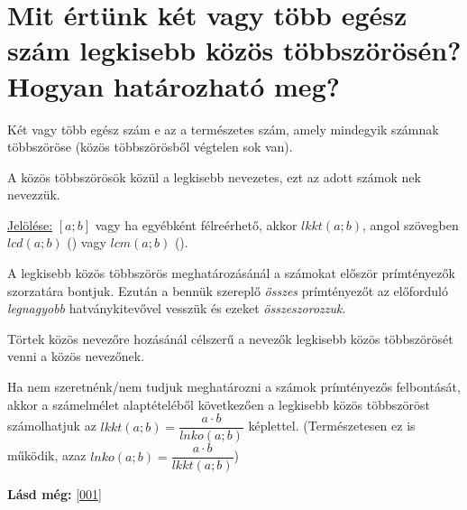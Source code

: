
\section{Mit értünk két vagy több egész szám legkisebb közös többszörösén?
\texorpdfstring{\\}{}Hogyan határozható meg?}
\label{002}

\begin{defin}
Két vagy több egész szám e az a természetes szám, amely mindegyik számnak többszöröse (közös többszörösből végtelen sok van).
\end{defin}

\begin{defin}
A közös többszörösök közül a legkisebb nevezetes, ezt az adott számok nek nevezzük.

\uline{Jelölése:} $[a; b]$ vagy ha egyébként félreérhető, akkor $lkkt(a; b)$, angol szövegben $lcd(a; b)$ () vagy $lcm(a; b)$ ().
\end{defin}

\begin{method}
A legkisebb közös többszörös meghatározásánál a számokat először prímtényezők szorzatára bontjuk. Ezután a bennük szereplő \emph{összes} prímtényezőt az előforduló \emph{legnagyobb} hatványkitevővel vesszük és ezeket \emph{összeszorozzuk}.
\end{method}

\begin{note2}
Törtek közös nevezőre hozásánál célszerű a nevezők legkisebb közös többszörösét venni a közös nevezőnek.
\end{note2}

\begin{method2}
Ha nem szeretnénk/nem tudjuk meghatározni a számok prímtényezős felbontását, akkor a számelmélet alaptételéből következően a legkisebb közös többszöröst számolhatjuk az $lkkt(a; b) = \dfrac{a \cdot b}{lnko(a; b)}$ képlettel. (Természetesen ez  is működik, azaz $lnko(a; b) = \dfrac{a \cdot b}{lkkt(a; b)}$)
\end{method2}

\textbf{Lásd még:} \ref{001}